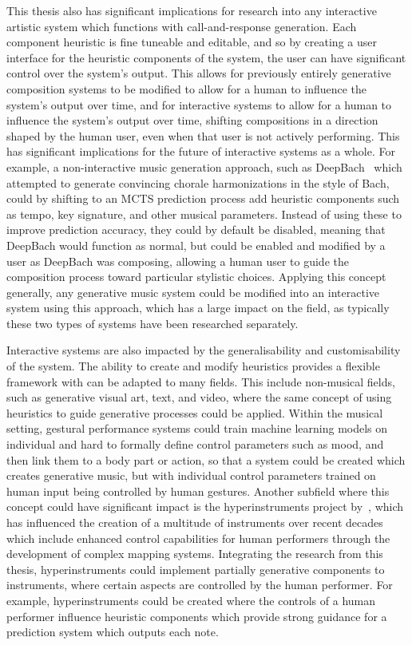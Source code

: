 This thesis also has significant implications for research into any interactive artistic system which functions with call-and-response generation. Each component heuristic is fine tuneable and editable, and so by creating a user interface for the heuristic components of the system, the user can have significant control over the system's output. This allows for previously entirely generative composition systems to be modified to allow for a human to influence the system's output over time, and for interactive systems to allow for a human to influence the system's output over time, shifting compositions in a direction shaped by the human user, even when that user is not actively performing. This has significant implications for the future of interactive systems as a whole. For example, a non-interactive music generation approach, such as DeepBach~\citep{Hadjeres2017DeepBach} which attempted to generate convincing chorale harmonizations in the style of Bach, could by shifting to an MCTS prediction process add heuristic components such as tempo, key signature, and other musical parameters. Instead of using these to improve prediction accuracy, they could by default be disabled, meaning that DeepBach would function as normal, but could be enabled and modified by a user as DeepBach was composing, allowing a human user to guide the composition process toward particular stylistic choices. Applying this concept generally, any generative music system could be modified into an interactive system using this approach, which has a large impact on the field, as typically these two types of systems have been researched separately.

Interactive systems are also impacted by the generalisability and customisability of the system. The ability to create and modify heuristics provides a flexible framework with can be adapted to many fields. This include non-musical fields, such as generative visual art, text, and video, where the same concept of using heuristics to guide generative processes could be applied. Within the musical setting, gestural performance systems could train machine learning models on individual and hard to formally define control parameters such as mood, and then link them to a body part or action, so that a system could be created which creates generative music, but with individual control parameters trained on human input being controlled by human gestures. Another subfield where this concept could have significant impact is the hyperinstruments project by~\cite{Machover1989Hyperinstruments}, which has influenced the creation of a multitude of instruments over recent decades which include enhanced control capabilities for human performers through the development of complex mapping systems. Integrating the research from this thesis, hyperinstruments could implement partially generative components to instruments, where certain aspects are controlled by the human performer. For example, hyperinstruments could be created where the controls of a human performer influence heuristic components which provide strong guidance for a prediction system which outputs each note. 

